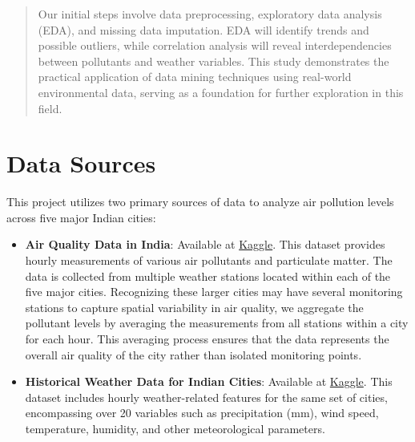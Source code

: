 \documentclass[twoside,11pt]{article}
\begin{document}
\begin{abstract}
  Our initial steps involve data preprocessing, exploratory data analysis (EDA), and missing data imputation. EDA will identify trends and possible outliers, while correlation analysis will reveal interdependencies between pollutants and weather variables. This study demonstrates the practical application of data mining techniques using real-world environmental data, serving as a foundation for further exploration in this field.
  
  \end{abstract}

\newpage



\section{Data Sources}

This project utilizes two primary sources of data to analyze air pollution levels across five major Indian cities:

\begin{itemize}
    \item \textbf{Air Quality Data in India}: Available at \href{https://www.kaggle.com/datasets/rohanrao/air-quality-data-in-india}{Kaggle}. This dataset provides hourly measurements of various air pollutants and particulate matter. The data is collected from multiple weather stations located within each of the five major cities. Recognizing these larger cities may have several monitoring stations to capture spatial variability in air quality, we aggregate the pollutant levels by averaging the measurements from all stations within a city for each hour. This averaging process ensures that the data represents the overall air quality of the city rather than isolated monitoring points.

    \item \textbf{Historical Weather Data for Indian Cities}: Available at \href{https://www.kaggle.com/datasets/hiteshsoneji/historical-weather-data-for-indian-cities}{Kaggle}. This dataset includes hourly weather-related features for the same set of cities, encompassing over 20 variables such as precipitation (mm), wind speed, temperature, humidity, and other meteorological parameters. \cite{hitesh_soneji_2020}
\end{itemize}
\end{document}
